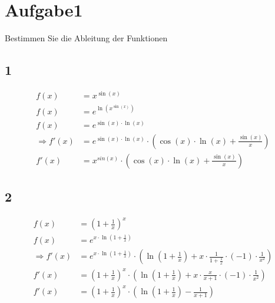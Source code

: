 \documentclass[18pt, 4paper]{article}
\begin{document}
\section*{Aufgabe1}
Bestimmen Sie die Ableitung der Funktionen

\subsection*{1}
\begin{align*}
	f(x)&=x^{\sin(x)}\\
	f(x)&= e^{\ln(x^{\sin(x)})}\\
	f(x)&= e^{\sin(x) \cdot \ln(x)}\\
	\Rightarrow f'(x)&= e^{\sin(x) \cdot \ln(x)}\cdot \left(\cos(x)\cdot \ln(x) + \frac{\sin(x)}{x}\right)\\
	f'(x)&= x^{sin(x)}\cdot \left(\cos(x)\cdot \ln(x) + \frac{\sin(x)}{x}\right)
\end{align*}

\subsection*{2}
\begin{align*}
	f(x)&=\left(1+\frac{1}{x}\right)^x\\
	f(x)&= e^{x\cdot\ln\left(1+\frac{1}{x}\right)}\\
	\Rightarrow f'(x)&= e^{x\cdot\ln\left(1+\frac{1}{x}\right)}\cdot
	\left(
		\ln\left(1+\frac{1}{x}\right) +
		x \cdot \frac{1}{1+ \frac{1}{x}} \cdot (-1) \cdot \frac{1}{x^2}
	\right)\\
	f'(x)&=\left(1+\frac{1}{x}\right)^x\cdot
	\left(
		\ln\left(1+\frac{1}{x}\right) +
		x \cdot \frac{x}{x+1} \cdot (-1) \cdot \frac{1}{x^2}
	\right)\\
	f'(x)&=\left(1+\frac{1}{x}\right)^x\cdot
	\left(
		\ln\left(1+\frac{1}{x}\right) -
		\frac{1}{x+1}
	\right)
\end{align*}
\end{document}

